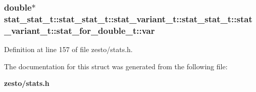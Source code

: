 \subsubsection[{var}]{\setlength{\rightskip}{0pt plus 5cm}double$\ast$ stat\_\-stat\_\-t::stat\_\-stat\_\-t::stat\_\-variant\_\-t::stat\_\-stat\_\-t::stat\_\-variant\_\-t::stat\_\-for\_\-double\_\-t::var}\label{structstat__stat__t_1_1stat__variant__t_1_1stat__for__double__t_ab69be2899a26793a266e9e2cd3af296}




Definition at line 157 of file zesto/stats.h.

The documentation for this struct was generated from the following file:\begin{CompactItemize}
\item 
{\bf zesto/stats.h}\end{CompactItemize}
